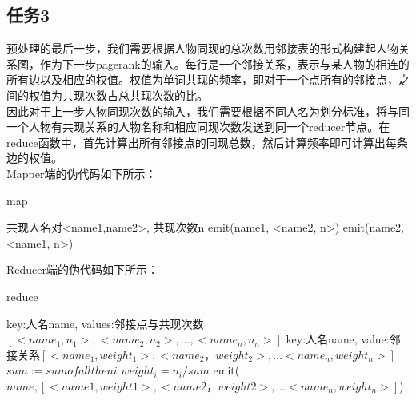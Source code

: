 \subsection{任务3}
预处理的最后一步，我们需要根据人物同现的总次数用邻接表的形式构建起人物关系图，作为下一步pagerank的输入。每行是一个邻接关系，表示与某人物的相连的所有边以及相应的权值。权值为单词共现的频率，即对于一个点所有的邻接点，之间的权值为共现次数占总共现次数的比。\\
\indent 因此对于上一步人物同现次数的输入，我们需要根据不同人名为划分标准，将与同一个人物有共现关系的人物名称和相应同现次数发送到同一个reducer节点。在reduce函数中，首先计算出所有邻接点的同现总数，然后计算频率即可计算出每条边的权值。\\
Mapper端的伪代码如下所示：
\begin{algorithm}[H]
	\caption{map}
	\begin{algorithmic}[1]
		\REQUIRE 共现人名对<name1,name2>, 共现次数n
		\STATE emit(name1, <name2, n>)
		\STATE emit(name2, <name1, n>)
	\end{algorithmic}
\end{algorithm}
Reducer端的伪代码如下所示：
\begin{algorithm}[H]
	\caption{reduce}
	\begin{algorithmic}[1]
		\REQUIRE key:人名name, values:邻接点与共现次数$[<name_1, n_1>, <name_2,n_2>,…,<name_n,n_n>]$
		\ENSURE key:人名name, value:邻接关系$[<name_1, weight_1>,<name_2，weight_2>,…<name_n,weight_n>]$
		\STATE $sum:=sum of all the ni$
		\STATE $weight_i=n_i/sum$
		\ENDFOR
		\STATE emit($name, [<name1, weight1>,<name2，weight2>,…<name_n, weight_n>]$)
	\end{algorithmic}
\end{algorithm}

